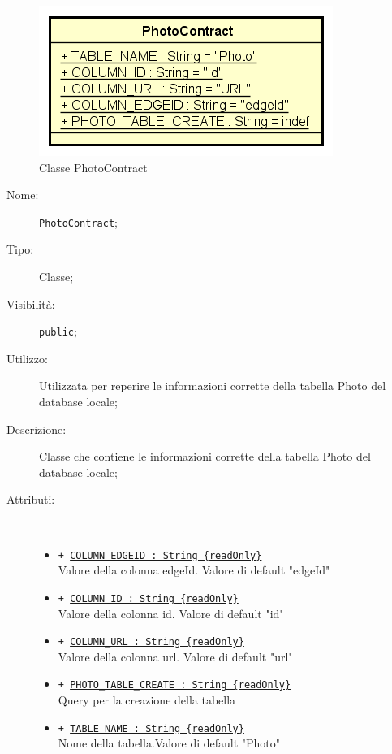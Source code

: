 \documentclass[../DefinizioneDiProdotto.tex]{subfiles}
\begin{document}
    \begin{figure}[H]
        \centering
        \includegraphics{img/PhotoContract.png}
        \caption{Classe PhotoContract}\label{fig:model::dataaccess::dao::PhotoContract} 
    \end{figure}
    \begin{description}
\item[Nome:] \texttt{PhotoContract};
\item[Tipo:] Classe;
\item[Visibilità:] \texttt{public};
\item[Utilizzo:] Utilizzata per reperire le informazioni corrette della tabella Photo del database locale;
\item[Descrizione:] Classe che contiene le informazioni corrette della tabella Photo del database locale;
\item[Attributi:] \
\begin{itemize}
\item \texttt{+ \underline{COLUMN\_EDGEID : String \{readOnly\}}}\\
Valore della colonna edgeId. Valore di default "edgeId"

\item \texttt{+ \underline{COLUMN\_ID : String \{readOnly\}}}\\
Valore della colonna id. Valore di default "id"

\item \texttt{+ \underline{COLUMN\_URL : String \{readOnly\}}}\\
Valore della colonna url. Valore di default "url"

\item \texttt{+ \underline{PHOTO\_TABLE\_CREATE : String \{readOnly\}}}\\
Query per la creazione della tabella

\item \texttt{+ \underline{TABLE\_NAME : String \{readOnly\}}}\\
Nome della tabella.Valore di default "Photo"

\end{itemize}
\end{description}
\end{document}
